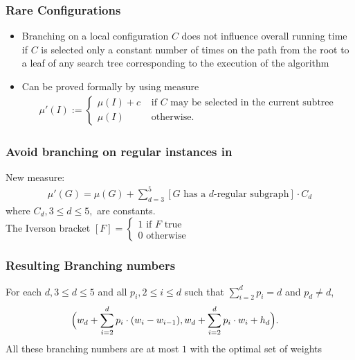 \begin{frame}
 \frametitle{Rare Configurations}
 \begin{itemize}
  \item Branching on a local configuration $C$ does not influence overall running time if $C$ is selected only a constant number of times on the path from the root to a leaf of any search tree corresponding to the execution of the algorithm
  \item Can be proved formally by using measure
\begin{align*}
 \mu'(I) := 
 \begin{cases}
  \mu(I)+c & \text{ if $C$ may be selected in the current subtree}\\
  \mu(I)   & \text{ otherwise.}
 \end{cases}
\end{align*} 
 \end{itemize}
\end{frame}

\begin{frame}
 \frametitle{Avoid branching on regular instances in \algmis}
 
\begin{algorithm}[H]
 {
 \DontPrintSemicolon
 \SetArgSty{}
 }
\end{algorithm}

New measure:
\begin{align*}
 \mu'(G) = \mu(G)+\sum_{d=3}^5 [G \text{ has a $d$-regular subgraph}] \cdot C_d
\end{align*}
where $C_d, 3 \le d \le 5,$ are constants.\\
The Iverson bracket $[F]=\begin{cases}1 \text{ if $F$ true}\\0\text{ otherwise}\end{cases}$
\end{frame}

\begin{frame}
 \frametitle{Resulting Branching numbers}

For each $d, 3 \le d \le 5$ and all $p_i, 2 \le i \le d$ such that $\sum_{i=2}^d p_i = d$ \alert{and $p_d \not = d$},
\begin{align*}
 \Big( &w_d + \sum_{i=2}^d p_i \cdot (w_i-w_{i-1}),
        w_d + \sum_{i=2}^d p_i \cdot w_i + h_d \Big). \notag
\end{align*}
All these branching numbers are at most $1$ with the optimal set of weights 
\end{frame}

